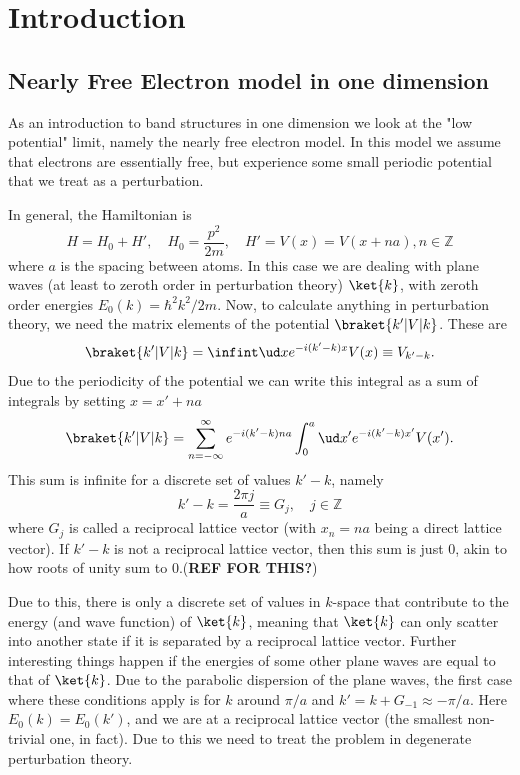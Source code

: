 \documentclass[main.tex]{subfiles}
\begin{document}
	\section{Introduction}
	
	
	\subsection{Nearly Free Electron model in one dimension}\label{sec:nearly_free}
	As an introduction to band structures in one dimension we look at the "low potential" limit, namely the nearly free electron model. In this model we assume that electrons are essentially free, but experience some small periodic potential that we treat as a perturbation.
	
	In general, the Hamiltonian is
	\begin{equation}
		H = H_0 + H', \quad H_0 = \frac{p^2}{2m}, \quad H' = V(x) = V(x + na), n \in \mathbb{Z}
	\end{equation}
	where $ a $ is the spacing between atoms. In this case we are dealing with plane waves (at least to zeroth order in perturbation theory) $ \ket{k} $, with zeroth order energies $ E_0(k)= \hbar^2 k^2/2m $. Now, to calculate anything in perturbation theory, we need the matrix elements of the potential $ \braket{k' | V | k} $. These are
	\begin{equation}
		\braket{k' | V | k} = \infint \ud x e^{-i(k'-k)x} V(x) \equiv V_{k'-k}.
	\end{equation}
	Due to the periodicity of the potential we can write this integral as a sum of integrals by setting $ x=x'+na $
	\begin{equation}
		\braket{k' | V | k} = \sum_{n = -\infty}^{\infty} e^{-i(k'-k) na} \int_{0}^{a} \ud x' e^{-i(k'-k)x'} V(x').
	\end{equation}
	This sum is infinite for a discrete set of values $ k'-k $, namely
	\begin{equation}
		k'-k = \frac{2\pi j}{a} \equiv G_j, \quad j \in \mathbb{Z}
	\end{equation}
	where $ G_j $ is called a reciprocal lattice vector (with $ x_n=na $ being a direct lattice vector). If $ k'-k $ is not a reciprocal lattice vector, then this sum is just 0, akin to how roots of unity sum to 0.(\textbf{REF FOR THIS?})
	
	Due to this, there is only a discrete set of values in $ k $-space that contribute to the energy (and wave function) of $ \ket{k} $, meaning that $ \ket{k} $ can only scatter into another state if it is separated by a reciprocal lattice vector. Further interesting things happen if the energies of some other plane waves are equal to that of $ \ket{k} $. Due to the parabolic dispersion of the plane waves, the first case where these conditions apply is for $ k $ around $ \pi/a $ and $ k'=k + G_{-1} \approx -\pi/a $. Here $ E_0(k) = E_0(k') $, and we are at a reciprocal lattice vector (the smallest non-trivial one, in fact). Due to this we need to treat the problem in degenerate perturbation theory.
	
\end{document}
